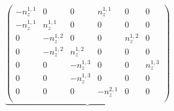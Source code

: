 \[
\underbrace{
\begin{pmatrix}
    - n_{z}^{1,1}  &  0                      & 0  & n_{z}^{1,1}    & 0 & 0 \\[3pt]
    - n_{z}^{1,1}  &  n_{z}^{1,1}  &  0  & 0 & 0  &  0               \\[3pt]
    0 & - n_{z}^{1,2}  &  0                   & 0 &  n_{z}^{1,2}   & 0     \\[3pt]
    0 & - n_{z}^{1,2}  &  n_{z}^{1,2}   & 0 &  0  &  0      \\[3pt]
    0 & 0 & - n_{z}^{1,3}  &  0             & 0   &  n_{z}^{1,3}  \\[3pt]
    0 & 0 & - n_{z}^{1,3}  &  0 & 0 &  0       \\[3pt]
    0 & 0 & 0 & - n_{z}^{2,1}  &  0         & 0          \\[3pt]

\end{pmatrix}}\]

